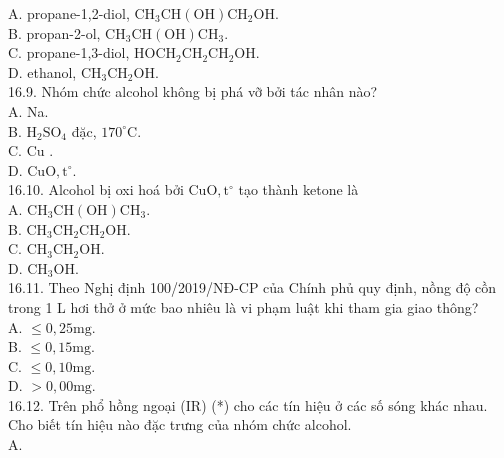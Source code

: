 \documentclass[10pt]{article}
\begin{document}
A. propane-1,2-diol, $\mathrm{CH}_{3} \mathrm{CH}(\mathrm{OH}) \mathrm{CH}_{2} \mathrm{OH}$.\\
B. propan-2-ol, $\mathrm{CH}_{3} \mathrm{CH}(\mathrm{OH}) \mathrm{CH}_{3}$.\\
C. propane-1,3-diol, $\mathrm{HOCH}_{2} \mathrm{CH}_{2} \mathrm{CH}_{2} \mathrm{OH}$.\\
D. ethanol, $\mathrm{CH}_{3} \mathrm{CH}_{2} \mathrm{OH}$.\\
16.9. Nhóm chức alcohol không bị phá vỡ bởi tác nhân nào?\\
A. Na.\\
B. $\mathrm{H}_{2} \mathrm{SO}_{4}$ đặc, $170^{\circ} \mathrm{C}$.\\
C. Cu .\\
D. $\mathrm{CuO}, \mathrm{t}^{\circ}$.\\
16.10. Alcohol bị oxi hoá bởi $\mathrm{CuO}, \mathrm{t}^{\circ}$ tạo thành ketone là\\
A. $\mathrm{CH}_{3} \mathrm{CH}(\mathrm{OH}) \mathrm{CH}_{3}$.\\
B. $\mathrm{CH}_{3} \mathrm{CH}_{2} \mathrm{CH}_{2} \mathrm{OH}$.\\
C. $\mathrm{CH}_{3} \mathrm{CH}_{2} \mathrm{OH}$.\\
D. $\mathrm{CH}_{3} \mathrm{OH}$.\\
16.11. Theo Nghị định 100/2019/NĐ-CP của Chính phủ quy định, nồng độ cồn trong 1 L hơi thở ở mức bao nhiêu là vi phạm luật khi tham gia giao thông?\\
A. $\leq 0,25 \mathrm{mg}$.\\
B. $\leq 0,15 \mathrm{mg}$.\\
C. $\leq 0,10 \mathrm{mg}$.\\
D. $>0,00 \mathrm{mg}$.\\
16.12. Trên phổ hồng ngoại (IR) (*) cho các tín hiệu ở các số sóng khác nhau. Cho biết tín hiệu nào đặc trưng của nhóm chức alcohol.\\
A.\\
\end{document}
